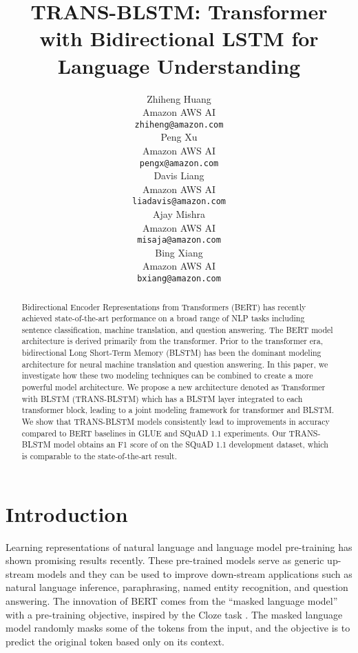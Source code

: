 \documentclass[11pt,a4paper]{article}
\title{TRANS-BLSTM: Transformer with Bidirectional LSTM for Language Understanding}
\author{Zhiheng Huang \\
  Amazon AWS AI \\
  \texttt{zhiheng@amazon.com} \\\And
  Peng Xu \\
  Amazon AWS AI \\
  \texttt{pengx@amazon.com} \\\And
  Davis Liang \\
  Amazon AWS AI \\
  \texttt{liadavis@amazon.com} \\\AND
  Ajay Mishra \\
  Amazon AWS AI \\
  \texttt{misaja@amazon.com} \\\And
  Bing Xiang \\
  Amazon AWS AI \\
  \texttt{bxiang@amazon.com} \\  
  }
\date{}
\begin{document}
\maketitle
\begin{abstract}
Bidirectional Encoder Representations from Transformers (BERT) has recently achieved state-of-the-art performance on a broad range of NLP tasks including sentence classification, machine translation, and question answering. The BERT model architecture is derived primarily from the transformer. Prior to the transformer era, bidirectional Long Short-Term Memory (BLSTM) has been the dominant modeling architecture for neural machine translation and question answering. In this paper, we investigate how these two modeling techniques can be combined to create a more powerful model architecture. We propose a new architecture denoted as Transformer with BLSTM (TRANS-BLSTM) which has a BLSTM layer integrated to each transformer block, leading to a joint modeling framework for transformer and BLSTM. We show that TRANS-BLSTM models consistently lead to improvements in accuracy compared to BERT baselines in GLUE and SQuAD 1.1 experiments. Our TRANS-BLSTM model obtains an F1 score of  on the SQuAD 1.1 development dataset, which is comparable to the state-of-the-art result.
\end{abstract}

\section{Introduction}
Learning representations \cite{mikolov2013} of natural language and language model pre-training \cite{devlin2018,radford2019language} has shown promising results recently. These pre-trained models serve as generic up-stream models and they can be used to improve down-stream applications such as natural language inference, paraphrasing, named entity recognition, and question answering. The innovation of BERT \cite{devlin2018} comes from the ``masked language model'' with a pre-training objective, inspired by the Cloze task \cite{taylor1953}. The masked language model randomly masks some of the tokens from the input, and the objective is to predict the original token based only on its context. 
\end{document}
